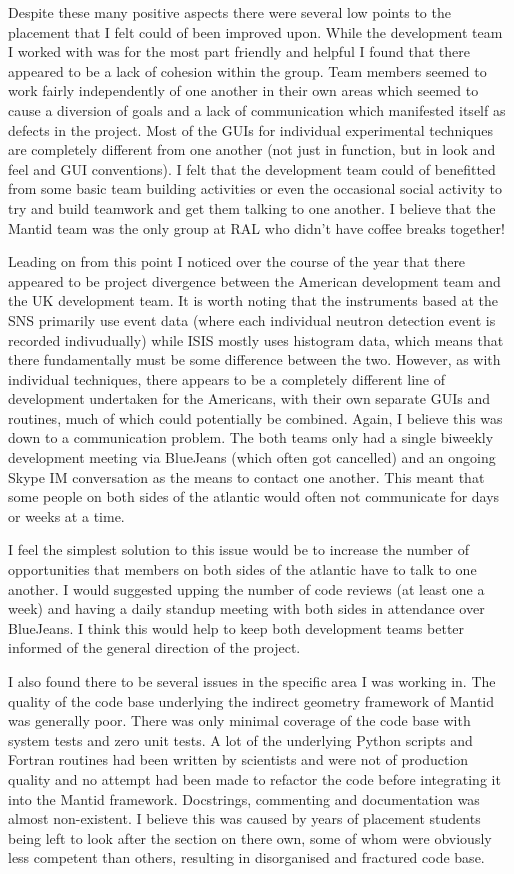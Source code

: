 \documentclass[paper=a4, fontsize=11pt]{scrartcl}	%
\numberwithin{equation}{section}															%
\numberwithin{figure}{section}																%
\numberwithin{table}{section}
\begin{document}
Despite these many positive aspects there were several low points to
the placement that I felt could of been improved upon. While the
development team I worked with was for the most part friendly and
helpful I found that there appeared to be a lack of cohesion within the
group. Team members seemed to work fairly independently of one another
in their own areas which seemed to cause a diversion of goals and a lack
of communication which manifested itself as defects in the project. Most
of the GUIs for individual experimental techniques are completely
different from one another (not just in function, but in look and feel
and GUI conventions). I felt that the development team could of
benefitted from some basic team building activities or even the
occasional social activity to try and build teamwork and get them
talking to one another. I believe that the Mantid team was the only
group at RAL who didn't have coffee breaks together!

Leading on from this point I noticed over the course of the year that
there appeared to be project divergence between the American development
team and the UK development team. It is worth noting that the
instruments based at the SNS primarily use event data (where each
individual neutron detection event is recorded indivudually) while ISIS
mostly uses histogram data, which means that there fundamentally must be
some difference between the two. However, as with individual techniques,
there appears to be a completely different line of development
undertaken for the Americans, with their own separate GUIs and routines,
much of which could potentially be combined. Again, I believe this was
down to a communication problem. The both teams only had a single
biweekly development meeting via BlueJeans (which often got cancelled)
and an ongoing Skype IM conversation as the means to contact one
another. This meant that some people on both sides of the atlantic would
often not communicate for days or weeks at a time.

I feel the simplest solution to this issue would be to increase the
number of opportunities that members on both sides of the atlantic have
to talk to one another. I would suggested upping the number of code
reviews (at least one a week) and having a daily standup meeting with
both sides in attendance over BlueJeans. I think this would help to keep
both development teams better informed of the general direction of the
project.

I also found there to be several issues in the specific area I was
working in. The quality of the code base underlying the indirect
geometry framework of Mantid was generally poor. There was only minimal
coverage of the code base with system tests and zero unit tests. A lot
of the underlying Python scripts and Fortran routines had been written
by scientists and were not of production quality and no attempt had been
made to refactor the code before integrating it into the Mantid
framework. Docstrings, commenting and documentation was almost
non-existent. I believe this was caused by years of placement students being left to look after the section on there own, some of whom were obviously less competent than others, resulting in disorganised and fractured code base.
\end{document}
